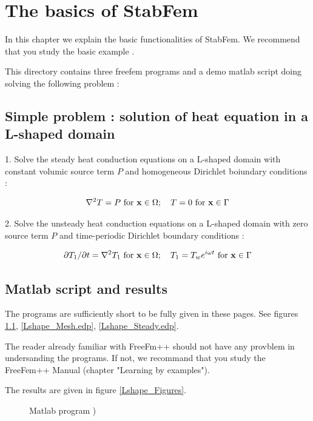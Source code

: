 

\chapter{The basics of StabFem }


In this chapter we explain the basic functionalities of StabFem. We recommend that you study the basic example .

This directory contains three freefem programs and a demo matlab script doing solving the following problem :


\section{Simple problem : solution of heat equation in a L-shaped domain}

1. Solve the steady heat conduction equations on a L-shaped domain with constant volumic source term $P$ and homogeneous Dirichlet boiundary conditions :

$$ \nabla^2 T = P  \mbox {  for } {\bf x} \in \Omega ; \quad T = 0   \mbox {  for } {\bf x} \in \Gamma$$

2.  Solve the unsteady heat conduction equations on a L-shaped domain with zero source term $P$ and time-periodic Dirichlet boundary conditions :

$$ 
 \partial T_1/\partial t= \nabla^2 T_1  \mbox {  for } {\bf x} \in \Omega ; \quad T_1 = T_w e^{i \omega t}   \mbox {  for } {\bf x} \in \Gamma
$$



\section{Matlab script and results}

The programs are sufficiently short to be fully given in these pages. See figures \ref{SCRIPT_Lshape.m},  \ref{Lshape_Mesh.edp}, \ref{Lshape_Steady.edp}.  

The reader already familiar with FreeFm++ should not have any provblem in undersanding the programs. If not, we recommand that you study the FreeFem++ Manual (chapter "Learning by examples").

The results are given in figure \ref{Lshape_Figures}.



\begin{figure}[t]
\small

 \normalsize
\caption{
Matlab program )}
\label{SCRIPT_Lshape.m}
\end{figure}


